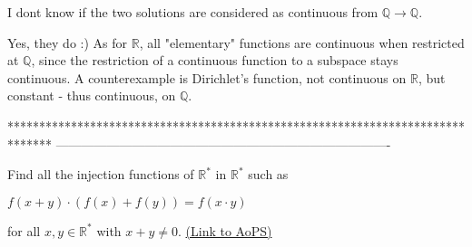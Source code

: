 \begin{solution}
	\begin{tcolorbox}I dont know if the two solutions are considered as continuous from $\mathbb Q\to\mathbb Q$.\end{tcolorbox}
Yes, they do :) As for $\mathbb{R}$, all "elementary" functions are continuous when restricted at $\mathbb{Q}$, since the restriction of a continuous function to a subspace stays continuous. A counterexample is Dirichlet's function, not continuous on $\mathbb{R}$, but constant - thus continuous, on $\mathbb{Q}$.
\end{solution}
*******************************************************************************
-------------------------------------------------------------------------------

\begin{problem}
	Find all the injection functions of $ \mathbb{R^*} $ in $ \mathbb{R^*} $ such as

$ f(x+y) \cdot ( f(x)+f(y)) = f(x \cdot y) $

for all $x, y \in \mathbb{R^*}$ with $x+y \ne 0$.
	\flushright \href{https://artofproblemsolving.com/community/c6h611103}{(Link to AoPS)}
\end{problem}



